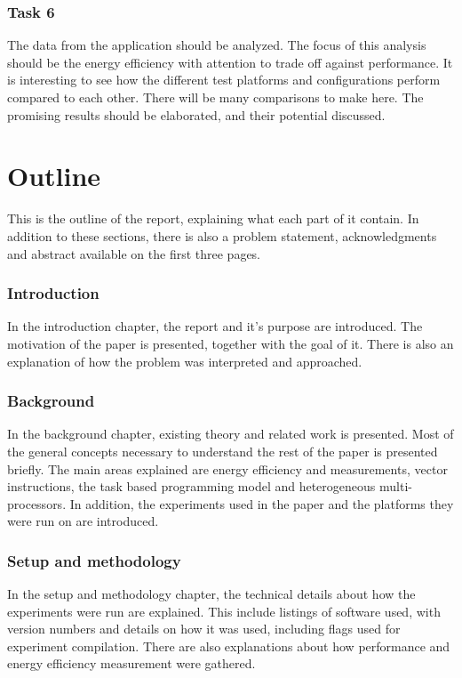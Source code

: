 \subsubsection{Task 6}
The data from the application should be analyzed.
The focus of this analysis should be the energy efficiency with attention to trade off against performance.
It is interesting to see how the different test platforms and configurations perform compared to each other.
There will be many comparisons to make here.
The promising results should be elaborated, and their potential discussed.

\section{Outline}
This is the outline of the report, explaining what each part of it contain.
In addition to these sections, there is also a problem statement, acknowledgments and abstract available on the first three pages.
\subsubsection{Introduction}
In the introduction chapter, the report and it's purpose are introduced.
The motivation of the paper is presented, together with the goal of it.
There is also an explanation of how the problem was interpreted and approached.

\subsubsection{Background}
In the background chapter, existing theory and related work is presented.
Most of the general concepts necessary to understand the rest of the paper is presented briefly.
The main areas explained are energy efficiency and measurements, vector instructions, the task based programming model and heterogeneous multi-processors.
In addition, the experiments used in the paper and the platforms they were run on are introduced.

\subsubsection{Setup and methodology}
In the setup and methodology chapter, the technical details about how the experiments were run are explained.
This include listings of software used, with version numbers and details on how it was used, including flags used for experiment compilation.
There are also explanations about how performance and energy efficiency measurement were gathered.

